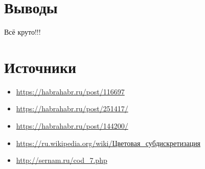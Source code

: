 \section*{Выводы}
Всё круто!!!

\section*{Источники}
\begin{itemize}
	\item\href{https://habrahabr.ru/post/116697}{https://habrahabr.ru/post/116697}
	\item\href{https://habrahabr.ru/post/251417/}{https://habrahabr.ru/post/251417/}
	\item\href{https://habrahabr.ru/post/144200/}{https://habrahabr.ru/post/144200/}
	\item\href{https://ru.wikipedia.org/wiki/%D0%A6%D0%B2%D0%B5%D1%82%D0%BE%D0%B2%D0%B0%D1%8F_%D1%81%D1%83%D0%B1%D0%B4%D0%B8%D1%81%D0%BA%D1%80%D0%B5%D1%82%D0%B8%D0%B7%D0%B0%D1%86%D0%B8%D1%8F}{https://ru.wikipedia.org/wiki/Цветовая\_субдискретизация}
	\item\href{http://sernam.ru/cod_7.php}{http://sernam.ru/cod\_7.php}
\end{itemize}



